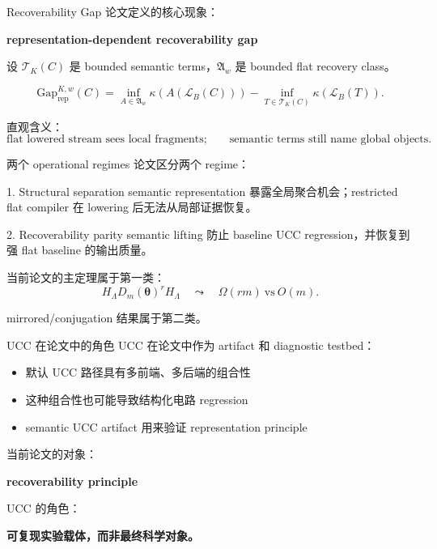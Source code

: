 \documentclass[aspectratio=169,11pt]{ctexbeamer}
\newcommand{\basis}{\mathcal{L}_B}
\newcommand{\cost}{\kappa}
\begin{document}
\begin{frame}{Recoverability Gap}
  论文定义的核心现象：

  \begin{center}
    \Large
    \textbf{representation-dependent recoverability gap}
  \end{center}

  设 $\mathcal{T}_K(C)$ 是 bounded semantic terms，$\mathfrak{A}_w$ 是 bounded flat recovery class。

  \[
  \mathrm{Gap}^{K,w}_{\mathrm{rep}}(C)
  =
  \inf_{A\in\mathfrak{A}_w}\cost(A(\basis(C)))
  -
  \inf_{T\in\mathcal{T}_K(C)}\cost(\basis(T)).
  \]

  直观含义：
  \[
    \text{flat lowered stream sees local fragments;}
    \qquad
    \text{semantic terms still name global objects.}
  \]
\end{frame}

\begin{frame}{两个 operational regimes}
  论文区分两个 regime：

  \begin{block}{1. Structural separation}
    semantic representation 暴露全局聚合机会；restricted flat compiler 在 lowering 后无法从局部证据恢复。
  \end{block}

  \vspace{0.5em}

  \begin{block}{2. Recoverability parity}
    semantic lifting 防止 baseline UCC regression，并恢复到强 flat baseline 的输出质量。
  \end{block}

  \vspace{0.8em}
  当前论文的主定理属于第一类：
  \[
    H_{\Lambda}D_m(\bm{\theta})^rH_{\Lambda}
    \quad\leadsto\quad
    \Omega(rm)\ \text{vs}\ O(m).
  \]

  mirrored/conjugation 结果属于第二类。
\end{frame}

\begin{frame}{UCC 在论文中的角色}
  UCC 在论文中作为 artifact 和 diagnostic testbed：

  \begin{itemize}
    \item 默认 UCC 路径具有多前端、多后端的组合性
    \item 这种组合性也可能导致结构化电路 regression
    \item semantic UCC artifact 用来验证 representation principle
  \end{itemize}

  \vspace{0.8em}
  当前论文的对象：

  \begin{center}
    \textbf{recoverability principle}
  \end{center}

  \vspace{0.4em}
  UCC 的角色：

  \begin{center}
    \textbf{可复现实验载体，而非最终科学对象。}
  \end{center}
\end{frame}
\end{document}
